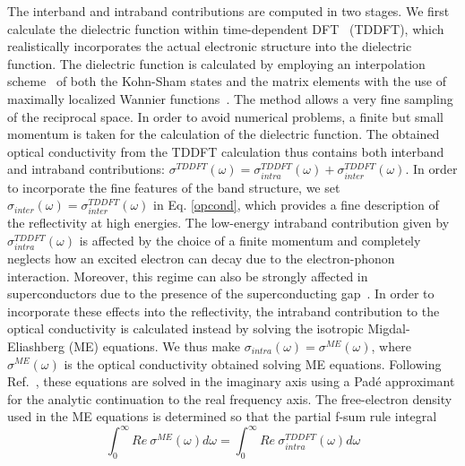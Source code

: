 \documentclass[11pt,titlepage,a4paper,twoside]{article}
\begin{document}
The interband and intraband contributions are computed in two stages. 
We first calculate
the dielectric function within time-dependent DFT~\cite{PhysRevLett.52.997,PhysRevLett.76.1212} (TDDFT),
which realistically incorporates the actual electronic structure
into the dielectric function. 
The dielectric function is calculated by employing  
an interpolation scheme~\cite{PhysRevB.85.054305,PhysRevB.86.085106,PhysRevB.89.085102} of both the Kohn-Sham states
and the matrix elements with the use of maximally localized Wannier functions~\cite{PhysRevB.56.12847,marzari2012}.
The method allows a very fine sampling of the reciprocal space.
In order to avoid numerical problems, a finite but small momentum
is taken for the calculation of the dielectric function. The obtained optical conductivity
from the TDDFT calculation thus contains both interband and intraband
contributions: $\sigma^{TDDFT}(\omega) = \sigma_{intra}^{TDDFT}(\omega)
+ \sigma_{inter}^{TDDFT}(\omega)$.
In order to incorporate
the fine features of the band structure,
we set $\sigma_{inter}(\omega)=\sigma_{inter}^{TDDFT}(\omega)$ in Eq. \eqref{opcond},
which provides a fine description of the reflectivity at high energies.
The low-energy intraband contribution given by
$\sigma_{intra}^{TDDFT}(\omega)$ is affected by the choice
of a finite momentum and completely neglects how
an excited electron can decay 
due to the electron-phonon interaction. Moreover, this regime can also be 
strongly affected in superconductors due to the presence of the 
superconducting gap~\cite{PhysRevLett.59.1958,Rotter1992,Capitani2016}.
In order to incorporate these effects into the reflectivity, the intraband
contribution to the optical conductivity is calculated instead by
solving the isotropic
Migdal-Eliashberg (ME) equations. We thus make
$\sigma_{intra}(\omega)=\sigma^{ME}(\omega)$,
where $\sigma^{ME}(\omega)$ is the optical conductivity obtained
solving ME equations. 
Following Ref.~\cite{PhysRevB.42.67},
these equations are solved 
in the imaginary axis using a Pad\'e approximant for the analytic continuation 
to the real frequency axis.
The free-electron density used in the 
ME equations is determined so that the partial f-sum rule integral
\begin{equation}
 \int_{0}^{\infty}Re~\sigma^{ME}(\omega)d\omega= \int_{0}^{\infty}Re~\sigma_{intra}^{TDDFT}(\omega)d\omega
\label{fsum}
\end{equation}
\end{document}
